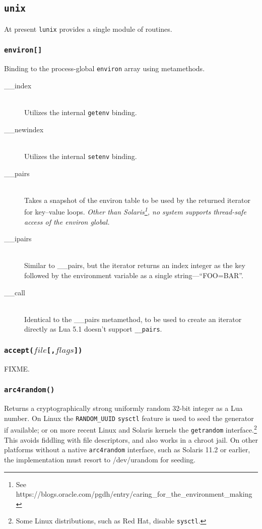 \documentclass[11pt, oneside]{memoir}
\newcommand*{\lunix}[0]{\texttt{lunix}\xspace}
\newcommand*{\syscall}[1]{\texttt{#1}\xspace}
\newcommand*{\fn}[1]{\texttt{#1}\xspace}
\newcommand*{\const}[1]{\texttt{#1}\xspace}
\newcounter{toccols}
\newenvironment{Module}[1]{
	\subsection{\texttt{#1}}
	\addtocontents{toc}{
		\protect\begin{multicols}{\value{toccols}}
	}
}{
	\addtocontents{toc}{\protect\end{multicols}}
}
\begin{document}
\begin{Module}{unix}

At present \lunix provides a single module of routines.

\subsubsection[\fn{environ[]}]{\fn{environ[]}}

Binding to the process-global \texttt{environ} array using metamethods.

\begin{description}
\item[\_\_index] \hfill \\
Utilizes the internal \fn{getenv} binding.
\item[\_\_newindex] \hfill \\
Utilizes the internal \fn{setenv} binding.
\item[\_\_pairs] \hfill \\
Takes a snapshot of the environ table to be used by the returned iterator for key--value loops. \emph{Other than Solaris\footnote{See https://blogs.oracle.com/pgdh/entry/caring\_for\_the\_environment\_making}, no system supports thread-safe access of the environ global.}
\item[\_\_ipairs] \hfill \\
Similar to \_\_pairs, but the iterator returns an index integer as the key followed by the environment variable as a single string---``FOO=BAR''.
\item[\_\_call] \hfill \\
Identical to the \_\_pairs metamethod, to be used to create an iterator directly as Lua 5.1 doesn't support \texttt{\_\_pairs}.
\end{description}

\subsubsection[\fn{accept}]{\fn{accept($file$[,$flags$])}}

FIXME.

\subsubsection[\fn{arc4random}]{\fn{arc4random()}}

Returns a cryptographically strong uniformly random 32-bit integer as a Lua number. On Linux the \const{RANDOM\_UUID} \fn{sysctl} feature is used to seed the generator if available; or on more recent Linux and Solaris kernels the \syscall{getrandom} interface.\footnote{Some Linux distributions, such as Red Hat, disable \syscall{sysctl}.} This avoids fiddling with file descriptors, and also works in a chroot jail. On other platforms without a native \fn{arc4random} interface, such as Solaris 11.2 or earlier, the implementation must resort to /dev/urandom for seeding.


\end{Module}
\end{document}

